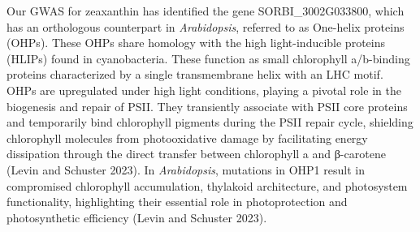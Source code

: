 \documentclass[10pt,letterpaper]{article}
\begin{document}
\begin{itemize}
Our GWAS for zeaxanthin has identified the gene SORBI\_3002G033800, which has an orthologous counterpart in \textit{Arabidopsis}, referred to as One-helix proteins (OHPs). These OHPs share homology with the high light-inducible proteins (HLIPs) found in cyanobacteria. These function as small chlorophyll a/b-binding proteins characterized by a single transmembrane helix with an LHC motif. OHPs are upregulated under high light conditions, playing a pivotal role in the biogenesis and repair of PSII. They transiently associate with PSII core proteins and temporarily bind chlorophyll pigments during the PSII repair cycle, shielding chlorophyll molecules from photooxidative damage by facilitating energy dissipation through the direct transfer between chlorophyll a and β-carotene (Levin and Schuster 2023). In \textit{Arabidopsis}, mutations in OHP1 result in compromised chlorophyll accumulation, thylakoid architecture, and photosystem functionality, highlighting their essential role in photoprotection and photosynthetic efficiency (Levin and Schuster 2023).




\end{itemize}
\end{document}
